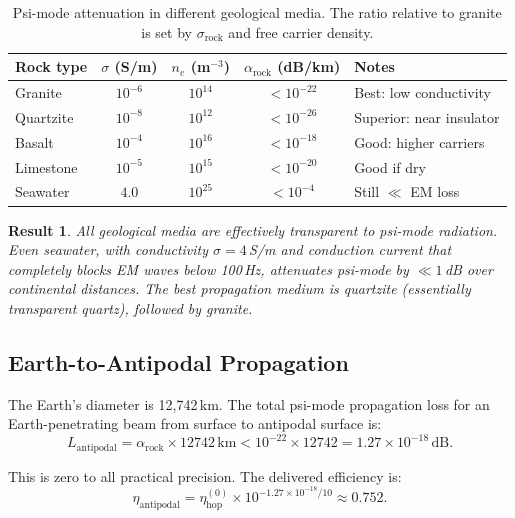 \documentclass[aps,prd,twocolumn,superscriptaddress]{revtex4-2}
\newcommand{\etahop}{\eta_\mathrm{hop}}
\newcommand{\alpharock}{\alpha_\mathrm{rock}}
\newtheorem{result}{Result}
\begin{document}
\begin{table}[H]
\centering
\caption{Psi-mode attenuation in different geological media.
The ratio relative to granite is set by $\sigma_\mathrm{rock}$ and
free carrier density.}
\label{tab:rock_types}
\begin{tabular}{lcccl}
\toprule
Rock type & $\sigma$ (S/m) & $n_e$ (m$^{-3}$) &
  $\alpharock$ (dB/km) & Notes \\
\midrule
Granite    & $10^{-6}$ & $10^{14}$ & $<10^{-22}$ & Best: low conductivity \\
Quartzite  & $10^{-8}$ & $10^{12}$ & $<10^{-26}$ & Superior: near insulator \\
Basalt     & $10^{-4}$ & $10^{16}$ & $<10^{-18}$ & Good: higher carriers \\
Limestone  & $10^{-5}$ & $10^{15}$ & $<10^{-20}$ & Good if dry \\
Seawater   & $4.0$     & $10^{25}$ & $<10^{-4}$  & Still $\ll$ EM loss \\
\bottomrule
\end{tabular}
\end{table}

\begin{result}
All geological media are effectively transparent to psi-mode radiation.
Even seawater, with conductivity $\sigma = 4$\,S/m and conduction current
that completely blocks EM waves below 100\,Hz, attenuates psi-mode
by $\ll 1$\,dB over continental distances.  The best propagation medium
is quartzite (essentially transparent quartz), followed by granite.
\end{result}

\subsection{Earth-to-Antipodal Propagation}

The Earth's diameter is 12,742\,km.  The total psi-mode propagation loss
for an Earth-penetrating beam from surface to antipodal surface is:
\begin{equation}
L_\mathrm{antipodal} = \alpharock \times 12742\,\mathrm{km}
< 10^{-22} \times 12742 = 1.27\times10^{-18}\,\mathrm{dB}.
\label{eq:antipodal_loss}
\end{equation}

This is zero to all practical precision.  The delivered efficiency is:
\begin{equation}
\eta_\mathrm{antipodal} = \etahop^{(0)} \times 10^{-1.27\times10^{-18}/10}
\approx 0.752.
\label{eq:eta_antipodal}
\end{equation}
\end{document}
